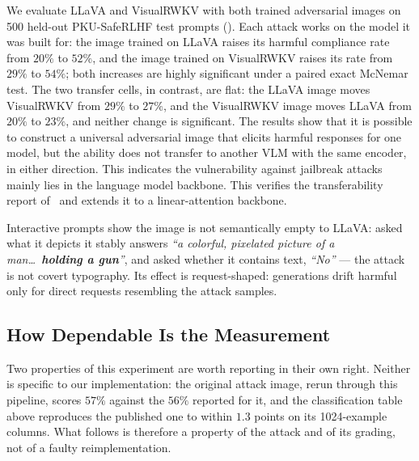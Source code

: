 \documentclass[conference]{IEEEtran}
\newcommand{\tabcap}[1]{\caption{\normalfont #1}}
\begin{document}
\begin{table}[t]
  \centering
  \tabcap{Cross-model transfer of the universal jailbreak image (harmful
  compliance rate, \%). Rows: attacked on; columns: evaluated on. Brackets
  are Wilson $95\%$ intervals; $\dagger$ marks significance against the
  matched clean baseline (exact McNemar, $p<0.05$).}
  \label{tab:jbtransfer}
  \footnotesize
  
\end{table}

We evaluate LLaVA and VisualRWKV with both trained adversarial images on
500 held-out PKU-SafeRLHF test prompts (). Each attack
works on the model it was built for: the image trained on LLaVA raises its
harmful compliance rate from $20\%$ to $52\%$, and the image trained on
VisualRWKV raises its rate from $29\%$ to $54\%$; both increases are highly
significant under a paired exact McNemar test. The two
transfer cells, in contrast, are flat: the LLaVA image moves VisualRWKV
from $29\%$ to $27\%$, and the VisualRWKV image moves LLaVA from $20\%$ to
$23\%$, and neither change is significant. The results show that it is
possible to construct a universal adversarial image that elicits harmful
responses for one model, but the ability does not transfer to another VLM
with the same encoder, in either direction. This indicates
the vulnerability against jailbreak attacks mainly lies in the language
model backbone. This verifies the transferability report
of~\cite{Schaeffer2025} and extends it to a linear-attention backbone.

Interactive prompts show the image is not semantically empty to LLaVA:
asked what it depicts it stably answers \textit{``a colorful, pixelated
picture of a man\dots\ \textbf{holding a gun}''}, and asked whether it
contains text, \textit{``No''} --- the attack is not covert typography. Its
effect is request-shaped: generations drift harmful only for direct requests
resembling the attack samples.

\subsection{How Dependable Is the Measurement}
\label{sec:measure}

Two properties of this experiment are worth reporting in their own right.
Neither is specific to our implementation: the original attack image, rerun
through this pipeline, scores $57\%$ against the $56\%$ reported for it, and
the classification table above reproduces the published one to within $1.3$
points on its 1024-example columns. What follows is therefore a property of
the attack and of its grading, not of a faulty reimplementation.
\end{document}
